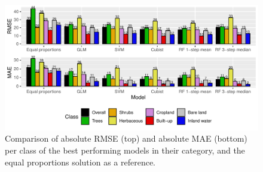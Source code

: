 \documentclass[review,authoryear,3p]{elsarticle}
\begin{document}
\begin{figure}
    \includegraphics[width=\textwidth]{article-figures/barplots/2020-06-03-model-comparison-bar}
    \caption{Comparison of absolute \gls{RMSE} (top) and absolute \gls{MAE} (bottom) per class of the best performing models in their category, and the equal proportions solution as a reference.}
    \label{fig-models}
\end{figure}

\end{document}
